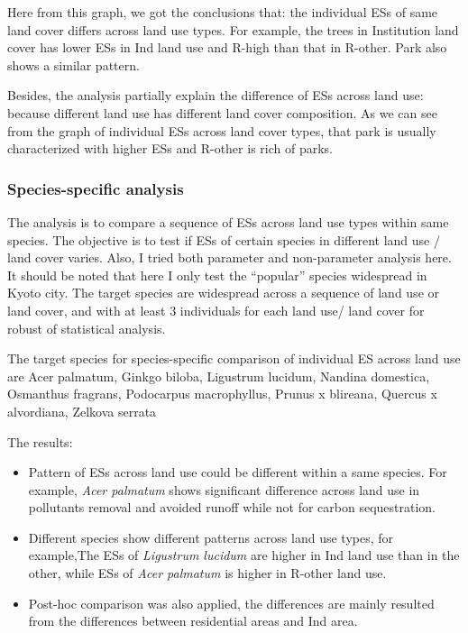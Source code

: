 \documentclass[
]{article}
\begin{document}
Here from this graph, we got the conclusions that: the individual ESs of same land cover differs across land use types. For example, the trees in Institution land cover has lower ESs in Ind land use and R-high than that in R-other. Park also shows a similar pattern.

Besides, the analysis partially explain the difference of ESs across land use: because different land use has different land cover composition. As we can see from the graph of individual ESs across land cover types, that park is usually characterized with higher ESs and R-other is rich of parks.

\hypertarget{species-specific-analysis}{%
\subsubsection{Species-specific analysis}\label{species-specific-analysis}}

The analysis is to compare a sequence of ESs across land use types within same species. The objective is to test if ESs of certain species in different land use / land cover varies. Also, I tried both parameter and non-parameter analysis here.
It should be noted that here I only test the ``popular'' species widespread in Kyoto city. The target species are widespread across a sequence of land use or land cover, and with at least 3 individuals for each land use/ land cover for robust of statistical analysis.

The target species for species-specific comparison of individual ES across land use are Acer palmatum, Ginkgo biloba, Ligustrum lucidum, Nandina domestica, Osmanthus fragrans, Podocarpus macrophyllus, Prunus x blireana, Quercus x alvordiana, Zelkova serrata

The results:

\begin{itemize}
\item
  Pattern of ESs across land use could be different within a same species. For example, \emph{Acer palmatum} shows significant difference across land use in pollutants removal and avoided runoff while not for carbon sequestration.
\item
  Different species show different patterns across land use types, for example,The ESs of \emph{Ligustrum lucidum} are higher in Ind land use than in the other, while ESs of \emph{Acer palmatum} is higher in R-other land use.
\item
  Post-hoc comparison was also applied, the differences are mainly resulted from the differences between residential areas and Ind area.
\end{itemize}
\end{document}
